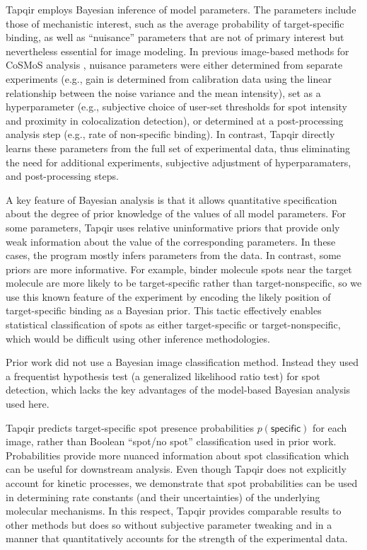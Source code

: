 Tapqir employs Bayesian inference of model parameters. The parameters include those of mechanistic interest, such as the average probability of target-specific binding, as well as ``nuisance'' parameters that are not of primary interest but nevertheless essential for image modeling. In previous image-based methods for CoSMoS analysis  \cite{Friedman2015-nx,Smith2019-yb}, nuisance parameters were either determined from separate experiments (e.g., gain is determined from calibration data using the linear relationship between the noise variance and the mean intensity), set as a hyperparameter (e.g., subjective choice of user-set thresholds for spot intensity and proximity in colocalization detection), or determined at a post-processing analysis step (e.g., rate of non-specific binding). In contrast, Tapqir directly learns these parameters from the full set of experimental data, thus eliminating the need for additional experiments, subjective adjustment of hyperparamaters, and post-processing steps.

A key feature of Bayesian analysis is that it allows quantitative specification about the degree of prior knowledge of the values of all model parameters. For some parameters, Tapqir uses relative uninformative priors that provide only weak information about the value of the corresponding parameters.  In these cases, the program mostly infers parameters from the data.  In contrast, some priors are more informative.  For example, binder molecule spots near the target molecule are more likely to be target-specific rather than target-nonspecific, so we use this known feature of the experiment by encoding the likely position of target-specific binding as a Bayesian prior. This tactic effectively enables statistical classification of spots as either target-specific or target-nonspecific, which would be difficult using other inference methodologies.

Prior work \cite{Smith2019-yb,Smith2015-gf} did not use a Bayesian image classification method.  Instead they used a frequentist hypothesis test (a generalized likelihood ratio test) for spot detection, which lacks the key advantages of the model-based Bayesian analysis used here.

Tapqir predicts target-specific spot presence probabilities $p(\mathsf{specific})$ for each image, rather than Boolean ``spot/no spot'' classification used in prior work. Probabilities provide more nuanced information about spot classification which can be useful for downstream analysis. Even though Tapqir does not explicitly account for kinetic processes, we demonstrate that spot probabilities can be used in determining rate constants (and their uncertainties) of the underlying molecular mechanisms. In this respect, Tapqir provides comparable results to other methods but does so without subjective parameter tweaking and in a manner that quantitatively accounts for the strength of the experimental data.

